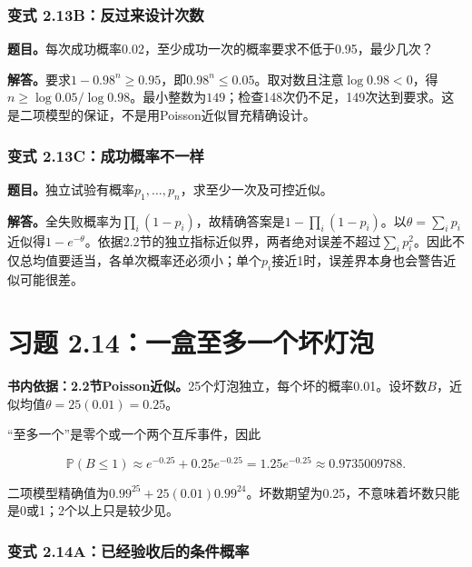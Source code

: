 \documentclass[12pt,a4paper,UTF8,fontset=fandol]{ctexart}
\begin{document}
\subsubsection{变式
2.13B：反过来设计次数}\label{ux53d8ux5f0f-2.13bux53cdux8fc7ux6765ux8bbeux8ba1ux6b21ux6570}

\textbf{题目。}每次成功概率0.02，至少成功一次的概率要求不低于0.95，最少几次？

\textbf{解答。}要求\(1-0.98^n\ge0.95\)，即\(0.98^n\le0.05\)。取对数且注意\(\log0.98<0\)，得\(n\ge\log0.05/\log0.98\)。最小整数为\(\boxed{149}\)；检查148次仍不足，149次达到要求。这是二项模型的保证，不是用Poisson近似冒充精确设计。

\subsubsection{变式
2.13C：成功概率不一样}\label{ux53d8ux5f0f-2.13cux6210ux529fux6982ux7387ux4e0dux4e00ux6837}

\textbf{题目。}独立试验有概率\(p_1,\ldots,p_n\)，求至少一次及可控近似。

\textbf{解答。}全失败概率为\(\prod_i(1-p_i)\)，故精确答案是\(1-\prod_i(1-p_i)\)。以\(\theta=\sum_i p_i\)近似得\(1-e^{-\theta}\)。依据2.2节的独立指标近似界，两者绝对误差不超过\(\sum_i p_i^2\)。因此不仅总均值要适当，各单次概率还必须小；单个\(p_i\)接近1时，误差界本身也会警告近似可能很差。

\section{习题
2.14：一盒至多一个坏灯泡}\label{ux4e60ux9898-2.14ux4e00ux76d2ux81f3ux591aux4e00ux4e2aux574fux706fux6ce1}

\textbf{书内依据：2.2节Poisson近似。}25个灯泡独立，每个坏的概率0.01。设坏数\(B\)，近似均值\(\theta=25(0.01)=0.25\)。

``至多一个''是零个或一个两个互斥事件，因此

\[
\boxed{\mathbb P(B\le1)\approx e^{-0.25}+0.25e^{-0.25}
=1.25e^{-0.25}\approx0.9735009788.}
\]

二项模型精确值为\(0.99^{25}+25(0.01)0.99^{24}\)。坏数期望为0.25，不意味着坏数只能是0或1；2个以上只是较少见。

\subsubsection{变式
2.14A：已经验收后的条件概率}\label{ux53d8ux5f0f-2.14aux5df2ux7ecfux9a8cux6536ux540eux7684ux6761ux4ef6ux6982ux7387}
\end{document}
